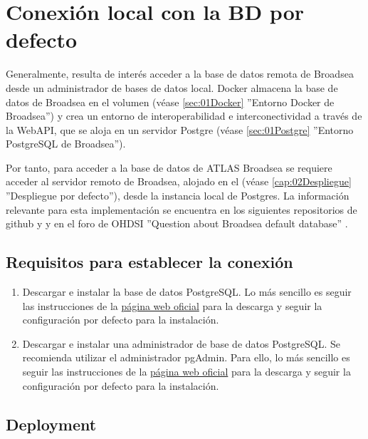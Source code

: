\chapter{Conexión local con la BD por defecto} \label{cap:03ConexLocal}

Generalmente, resulta de interés acceder a la base de datos remota de Broadsea desde un administrador de bases de datos local.  Docker almacena la base de datos de Broadsea en el volumen  (véase \ref{sec:01Docker} ''Entorno Docker de Broadsea'') y crea un entorno de interoperabilidad e interconectividad a través de la WebAPI, que se aloja en un servidor Postgre (véase \ref{sec:01Postgre} ''Entorno PostgreSQL de Broadsea'').

Por tanto, para acceder a la base de datos de ATLAS Broadsea se requiere acceder al servidor remoto de Broadsea, alojado en el  (véase \ref{cap:02Despliegue} ''Despliegue por defecto''), desde la instancia local de Postgres. La información relevante para esta implementación se encuentra en los siguientes repositorios de github \parencite{githubBroadsea} y \parencite{githubBroadseaDB} y en el foro de OHDSI ''Question about Broadsea default database'' \parencite{forumBroadseaDB}.

\section{Requisitos para establecer la conexión} \label{sec:03requisitos}

\begin{enumerate}

    \item Descargar e instalar la base de datos PostgreSQL. Lo más sencillo es seguir las instrucciones de la \href{https://www.postgresql.org/download/}{página web oficial} para la descarga y seguir la configuración por defecto para la instalación.

    \item Descargar e instalar una administrador de base de datos PostgreSQL. Se recomienda utilizar el administrador pgAdmin. Para ello, lo más sencillo es seguir las instrucciones de la \href{https://www.pgadmin.org/download/}{página web oficial} para la descarga y seguir la configuración por defecto para la instalación.
    
\end{enumerate}

\section{Deployment} \label{sec:03Deployment}

